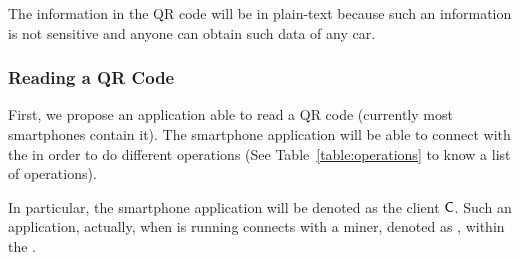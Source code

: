 The information in the QR code will be in plain-text because such an information is not 
sensitive and anyone can obtain such data of any car.


\subsubsection{Reading a QR Code}
\label{sssec:readingQR}

First, we propose an application able to read a QR code (currently most smartphones contain it).
The smartphone application will be able to connect with the \blockchaincarnetwork in order to do different 
operations (See Table~\ref{table:operations} to know a list of operations). 

In particular, the smartphone application will be denoted as the client $\textsf{C}$. Such an application, 
actually, when is running connects with a miner, denoted as \Server, within the \blockchaincarnetwork.



